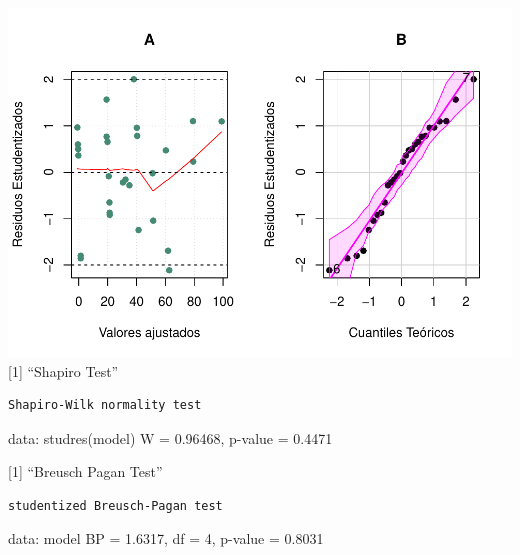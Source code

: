 \documentclass[
]{article}
\begin{document}
\includegraphics{Taller-2-Regresion-Multiple-Aplicada_files/figure-latex/unnamed-chunk-8-1.pdf}
{[}1{]} ``Shapiro Test''

\begin{verbatim}
Shapiro-Wilk normality test
\end{verbatim}

data: studres(model) W = 0.96468, p-value = 0.4471

{[}1{]} ``Breusch Pagan Test''

\begin{verbatim}
studentized Breusch-Pagan test
\end{verbatim}

data: model BP = 1.6317, df = 4, p-value = 0.8031

\hypertarget{section}{%
\subsection{}\label{section}}
\end{document}
